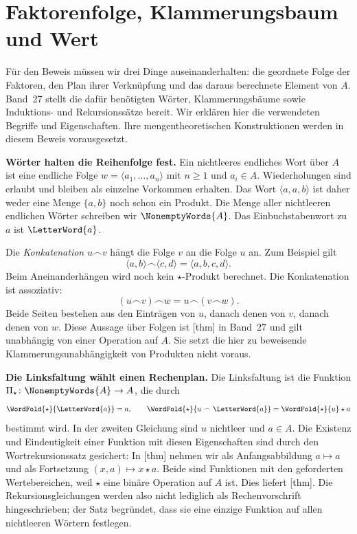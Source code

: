\section*{Faktorenfolge, Klammerungsbaum und Wert}

Für den Beweis müssen wir drei Dinge auseinanderhalten: die geordnete
Folge der Faktoren, den Plan ihrer Verknüpfung und das daraus berechnete
Element von \(A\). Band~27 stellt die dafür benötigten Wörter,
Klammerungsbäume sowie Induktions- und Rekursionssätze bereit.
Wir erklären hier die verwendeten Begriffe und Eigenschaften. Ihre
mengentheoretischen Konstruktionen werden in diesem Beweis vorausgesetzt.

\medskip\noindent\textbf{Wörter halten die Reihenfolge fest.}
Ein nichtleeres endliches Wort über \(A\) ist eine endliche Folge
\(w=\langle a_1,\ldots,a_n\rangle\) mit \(n\geq1\) und
\(a_i\in A\). Wiederholungen sind erlaubt und bleiben als einzelne
Vorkommen erhalten. Das Wort \(\langle a,a,b\rangle\) ist daher
weder eine Menge \(\{a,b\}\) noch schon ein Produkt. Die Menge
aller nichtleeren endlichen Wörter schreiben wir
\(\NonemptyWords{A}\). Das Einbuchstabenwort zu \(a\) ist
\(\LetterWord{a}\).

Die \emph{Konkatenation} \(u\frown v\) hängt die Folge \(v\)
an die Folge \(u\) an. Zum Beispiel gilt
\[
  \langle a,b\rangle\frown\langle c,d\rangle
    =\langle a,b,c,d\rangle.
\]
Beim Aneinanderhängen wird noch kein \(\star\)-Produkt berechnet.
Die Konkatenation ist assoziativ:
\[
  (u\frown v)\frown w=u\frown(v\frown w).
\]
Beide Seiten bestehen aus den Einträgen von \(u\), danach denen
von \(v\), danach denen von \(w\). Diese Aussage über Folgen ist
[thm] in Band~27 und
gilt unabhängig von einer Operation auf \(A\). Sie setzt die hier
zu beweisende Klammerungsunabhängigkeit von Produkten nicht voraus.

\medskip\noindent\textbf{Die Linksfaltung wählt einen Rechenplan.}
Die Linksfaltung ist die Funktion
\(\Pi_{\star}\colon\NonemptyWords{A}\to A\), die durch
\[
  \WordFold{\star}{\LetterWord{a}}=a,
  \qquad
  \WordFold{\star}{u\frown\LetterWord{a}}
    =\WordFold{\star}{u}\star a
\]
bestimmt wird. In der zweiten Gleichung sind \(u\) nichtleer und
\(a\in A\). Die Existenz und Eindeutigkeit einer Funktion mit
diesen Eigenschaften sind durch den Wortrekursionssatz gesichert:
In [thm] nehmen wir als
Anfangsabbildung \(a\mapsto a\) und als Fortsetzung
\((x,a)\mapsto x\star a\). Beide sind Funktionen mit den
geforderten Wertebereichen, weil \(\star\) eine binäre Operation
auf \(A\) ist. Dies liefert
[thm]. Die Rekursionsgleichungen
werden also nicht lediglich als Rechenvorschrift hingeschrieben;
der Satz begründet, dass sie eine einzige Funktion auf allen
nichtleeren Wörtern festlegen.


